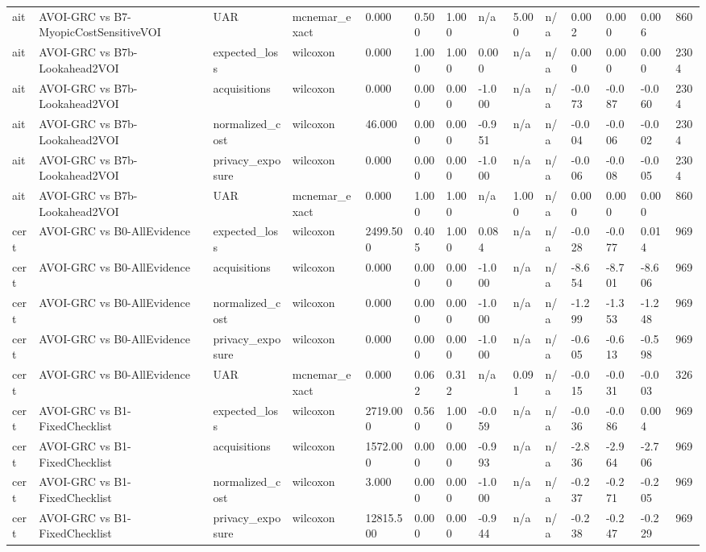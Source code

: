 \begin{table}[!ht]
{\begin{tabular}{llllllllllllll}
ait & AVOI-GRC vs B7-MyopicCostSensitiveVOI & UAR & mcnemar\_exact & 0.000 & 0.500 & 1.000 & n/a & 5.000 & n/a & 0.002 & 0.000 & 0.006 & 860 \\
ait & AVOI-GRC vs B7b-Lookahead2VOI & expected\_loss & wilcoxon & 0.000 & 1.000 & 1.000 & 0.000 & n/a & n/a & 0.000 & 0.000 & 0.000 & 2304 \\
ait & AVOI-GRC vs B7b-Lookahead2VOI & acquisitions & wilcoxon & 0.000 & 0.000 & 0.000 & -1.000 & n/a & n/a & -0.073 & -0.087 & -0.060 & 2304 \\
ait & AVOI-GRC vs B7b-Lookahead2VOI & normalized\_cost & wilcoxon & 46.000 & 0.000 & 0.000 & -0.951 & n/a & n/a & -0.004 & -0.006 & -0.002 & 2304 \\
ait & AVOI-GRC vs B7b-Lookahead2VOI & privacy\_exposure & wilcoxon & 0.000 & 0.000 & 0.000 & -1.000 & n/a & n/a & -0.006 & -0.008 & -0.005 & 2304 \\
ait & AVOI-GRC vs B7b-Lookahead2VOI & UAR & mcnemar\_exact & 0.000 & 1.000 & 1.000 & n/a & 1.000 & n/a & 0.000 & 0.000 & 0.000 & 860 \\
cert & AVOI-GRC vs B0-AllEvidence & expected\_loss & wilcoxon & 2499.500 & 0.405 & 1.000 & 0.084 & n/a & n/a & -0.028 & -0.077 & 0.014 & 969 \\
cert & AVOI-GRC vs B0-AllEvidence & acquisitions & wilcoxon & 0.000 & 0.000 & 0.000 & -1.000 & n/a & n/a & -8.654 & -8.701 & -8.606 & 969 \\
cert & AVOI-GRC vs B0-AllEvidence & normalized\_cost & wilcoxon & 0.000 & 0.000 & 0.000 & -1.000 & n/a & n/a & -1.299 & -1.353 & -1.248 & 969 \\
cert & AVOI-GRC vs B0-AllEvidence & privacy\_exposure & wilcoxon & 0.000 & 0.000 & 0.000 & -1.000 & n/a & n/a & -0.605 & -0.613 & -0.598 & 969 \\
cert & AVOI-GRC vs B0-AllEvidence & UAR & mcnemar\_exact & 0.000 & 0.062 & 0.312 & n/a & 0.091 & n/a & -0.015 & -0.031 & -0.003 & 326 \\
cert & AVOI-GRC vs B1-FixedChecklist & expected\_loss & wilcoxon & 2719.000 & 0.560 & 1.000 & -0.059 & n/a & n/a & -0.036 & -0.086 & 0.004 & 969 \\
cert & AVOI-GRC vs B1-FixedChecklist & acquisitions & wilcoxon & 1572.000 & 0.000 & 0.000 & -0.993 & n/a & n/a & -2.836 & -2.964 & -2.706 & 969 \\
cert & AVOI-GRC vs B1-FixedChecklist & normalized\_cost & wilcoxon & 3.000 & 0.000 & 0.000 & -1.000 & n/a & n/a & -0.237 & -0.271 & -0.205 & 969 \\
cert & AVOI-GRC vs B1-FixedChecklist & privacy\_exposure & wilcoxon & 12815.500 & 0.000 & 0.000 & -0.944 & n/a & n/a & -0.238 & -0.247 & -0.229 & 969 \\

\end{tabular}}
\end{table}
